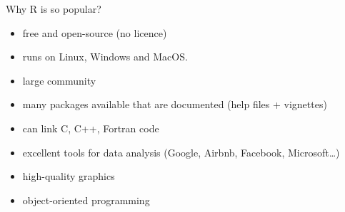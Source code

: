 \documentclass[8pt,ignorenonframetext,]{beamer}
\providecommand{\tightlist}{%
  \setlength{\itemsep}{0pt}\setlength{\parskip}{0pt}}
\begin{document}
\begin{frame}{Why R is so popular?}

\begin{itemize}
\tightlist
\item
  free and open-source (no licence)
\item
  runs on Linux, Windows and MacOS.
\item
  large community
\item
  many packages available that are documented (help files + vignettes)
\item
  can link C, C++, Fortran code
\item
  excellent tools for data analysis (Google, Airbnb, Facebook,
  Microsoft\ldots{})
\item
  high-quality graphics
\item
  object-oriented programming
\end{itemize}

\end{frame}
\end{document}
